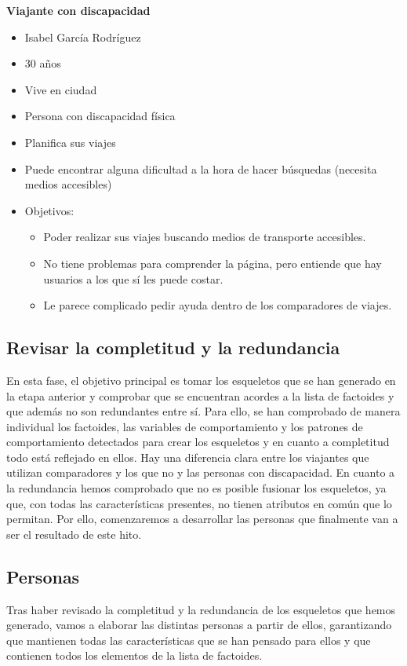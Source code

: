 \noindent \textbf{Viajante con discapacidad}
\begin{itemize}
    \item Isabel García Rodríguez
    \item 30 años
    \item Vive en ciudad
    \item Persona con discapacidad física
    \item Planifica sus viajes
    \item Puede encontrar alguna dificultad a la hora de hacer búsquedas (necesita medios accesibles)
    \item Objetivos:
    \begin{itemize}
        \item Poder realizar sus viajes buscando medios de transporte accesibles.
        \item No tiene problemas para comprender la página, pero entiende que hay usuarios a los que sí les puede costar.
        \item Le parece complicado pedir ayuda dentro de los comparadores de viajes.
    \end{itemize}             
\end{itemize}

\subsection{Revisar la completitud y la redundancia}
En esta fase, el objetivo principal es tomar los esqueletos que se han generado en la etapa anterior y comprobar que se encuentran acordes a la lista de factoides y que además no son redundantes entre sí. Para ello, se han comprobado de manera individual los factoides, las variables de comportamiento y los patrones de comportamiento detectados para crear los esqueletos y en cuanto a completitud todo está reflejado en ellos. 
Hay una diferencia clara entre los viajantes que utilizan comparadores y los que no y las personas con discapacidad. 
En cuanto a la redundancia hemos comprobado que no es posible fusionar los esqueletos, ya que, con todas las características presentes, no tienen atributos en común que lo permitan. Por ello, comenzaremos a desarrollar las personas que finalmente van a ser el resultado de este hito.

\subsection{Personas}
Tras haber revisado la completitud y la redundancia de los esqueletos que hemos generado, vamos a elaborar las distintas personas a partir de ellos, garantizando que mantienen todas las características que se han pensado para ellos y que contienen todos los elementos de la lista de factoides. \\

